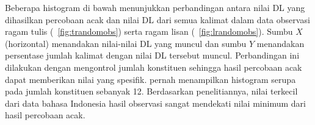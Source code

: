Beberapa histogram di bawah menunjukkan perbandingan antara nilai DL yang dihasilkan percobaan acak dan nilai DL dari semua kalimat dalam data observasi ragam tulis (\pic~\ref{fig:trandomobs}) serta ragam lisan (\pic~\ref{fig:lrandomobs}). Sumbu $X$ (horizontal) menandakan nilai-nilai DL yang muncul dan sumbu $Y$ menandakan persentase jumlah kalimat dengan nilai DL tersebut muncul. Perbandingan ini dilakukan dengan mengontrol jumlah konstituen sehingga hasil percobaan acak dapat memberikan nilai yang spesifik. \cite{futrell2015large} pernah menampilkan histogram serupa pada jumlah konstituen sebanyak 12. Berdasarkan penelitiannya, nilai terkecil dari data bahasa Indonesia hasil observasi sangat mendekati nilai minimum dari hasil percobaan acak.

\begin{figure}
\centering


\end{figure}
